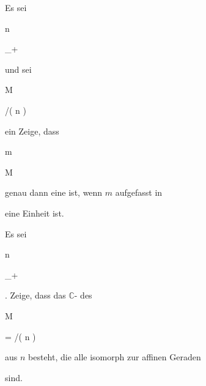 {


Es sei


\mavergleichskette

{\vergleichskette

{ n
}

{ \in }{ \N_+
}

{  }{
}

{    }{
}

{   }{
}

}
{}{}{}
und sei


\mavergleichskette

{\vergleichskette

{ M
}

{ \subseteq }{ \N \times \Z/( n )
}

{  }{
}

{    }{
}

{   }{
}

}
{}{}{}
ein
Zeige, dass


\mavergleichskette

{\vergleichskette

{ m
}

{ \in }{ M
}

{  }{
}

{    }{
}

{   }{
}

}
{}{}{}
genau dann eine
ist, wenn $m$ aufgefasst in

 eine Einheit ist.


}

{} {}



{}

{


Es sei


\mavergleichskette

{\vergleichskette

{ n
}

{ \in }{ \N_+
}

{  }{
}

{    }{
}

{   }{
}

}
{}{}{.}
Zeige, dass das
${\mathbb C}$-
des


\mavergleichskette

{\vergleichskette

{M
}

{ = }{ \N \times \Z/( n )
}

{  }{
}

{    }{
}

{   }{
}

}
{}{}{}
aus $n$
besteht, die alle isomorph zur affinen Geraden

 sind.


}

